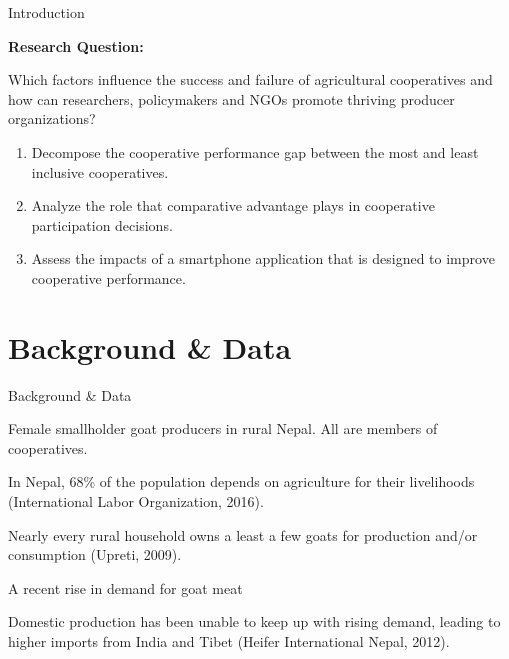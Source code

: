 \documentclass[aspectratio=169]{beamer}
\newenvironment{wideitemize}{\itemize\addtolength{\itemsep}{10pt}}{\enditemize}
\begin{document}
\begin{frame}{Introduction}

\textbf{Research Question:} \vspace{.5cm}
    \begin{wideitemize}
        \item Which factors influence the success and failure of agricultural cooperatives and how can researchers, policymakers and NGOs promote thriving producer organizations? \vspace{.25cm}
            \begin{enumerate}
                \item Decompose the cooperative performance gap between the most and least inclusive cooperatives. \vspace{.25cm}
                \item Analyze the role that comparative advantage plays in cooperative participation decisions. \vspace{.25cm}
                \item Assess the impacts of a smartphone application that is designed to improve cooperative performance.
            \end{enumerate}
    \end{wideitemize}
\end{frame}

\section{Background \& Data}

\begin{frame}{Background \& Data}
    \begin{wideitemize}
        \item Female smallholder goat producers in rural Nepal. All are members of cooperatives. 
        \item In Nepal, 68\% of the population depends on agriculture for their livelihoods (International Labor Organization, 2016). 
        \item Nearly every rural household owns a least a few goats for production and/or consumption (Upreti, 2009). 
        \item A recent rise in demand for goat meat \vspace{.25cm}
        \begin{wideitemize}
            \item Domestic production has been unable to keep up with rising demand, leading to higher imports from India and Tibet (Heifer International Nepal, 2012).
        \end{wideitemize}
    \end{wideitemize}
\end{frame}
\end{document}
